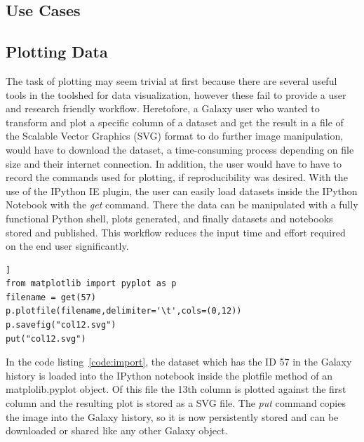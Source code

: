 \documentclass{bioinfo}
\begin{document}
\begin{methods}
\section{Use Cases}
\subsection{Plotting Data}
The task of plotting may seem trivial at first because there are several useful tools in the toolshed for data visualization,
however these fail to provide a user and research friendly workflow.
Heretofore, a Galaxy user who wanted to transform and plot a specific column of a dataset and
get the result in a file of the Scalable Vector Graphics (SVG) format to do further image manipulation,
would have to download the dataset, a time-consuming process depending on file size and their internet
connection. In addition, the user would have to have to record the commands used for plotting, if reproducibility was desired.
With the use of the IPython IE plugin, the user can easily load datasets inside the IPython Notebook with the \textit{get} command. There the data can be manipulated 
with a fully functional Python shell, plots generated, and finally datasets and notebooks stored and published.
This workflow reduces the input time and effort required on the end user significantly.

\begin{lstlisting}[frame=single,caption={Use Case Example},label=code:import]]
from matplotlib import pyplot as p
filename = get(57)
p.plotfile(filename,delimiter='\t',cols=(0,12))
p.savefig("col12.svg")
put("col12.svg")
\end{lstlisting}
In the code listing~\ref{code:import}, the dataset which has the ID 57 in the Galaxy history is loaded into the IPython notebook inside the
plotfile method of an matplolib.pyplot object. Of this file the 13th column is plotted against the first column and the
resulting plot is stored as a SVG file. The \textit{put} command copies the image into the Galaxy history, so it is now persistently
stored and can be downloaded or shared like any other Galaxy object.


\end{methods}
\end{document}
